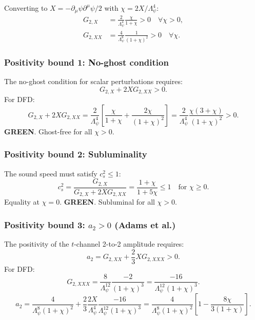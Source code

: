 \documentclass[11pt,a4paper]{article}
\newcommand{\GREEN}{\textcolor{dfdgreen}{\textbf{GREEN}}}
\begin{document}
Converting to $X = -\partial_\mu\psi\partial^\mu\psi/2$ with $\chi = 2X/\Lambda_\psi^4$:
\begin{align}
G_{2,X} &= \frac{2}{\Lambda_\psi^4}\frac{\chi}{1+\chi} > 0 \quad \forall \chi > 0, \label{eq:G2X-pos}\\
G_{2,XX} &= \frac{4}{\Lambda_\psi^8}\frac{1}{(1+\chi)^2} > 0 \quad \forall \chi. \label{eq:G2XX-pos}
\end{align}

\subsubsection{Positivity bound 1: No-ghost condition}

The no-ghost condition for scalar perturbations requires:
\begin{equation}
G_{2,X} + 2X G_{2,XX} > 0.
\end{equation}
For DFD:
\begin{equation}
G_{2,X} + 2X G_{2,XX} = \frac{2}{\Lambda_\psi^4}\left[\frac{\chi}{1+\chi} + \frac{2\chi}{(1+\chi)^2}\right] = \frac{2}{\Lambda_\psi^4}\frac{\chi(3+\chi)}{(1+\chi)^2} > 0.
\end{equation}
\GREEN. Ghost-free for all $\chi > 0$.

\subsubsection{Positivity bound 2: Subluminality}

The sound speed must satisfy $c_s^2 \leq 1$:
\begin{equation}
c_s^2 = \frac{G_{2,X}}{G_{2,X} + 2X G_{2,XX}} = \frac{1+\chi}{1+5\chi} \leq 1 \quad \text{for } \chi \geq 0.
\end{equation}
Equality at $\chi = 0$. \GREEN. Subluminal for all $\chi > 0$.

\subsubsection{Positivity bound 3: $a_2 > 0$ (Adams et al.)}

The positivity of the $t$-channel 2-to-2 amplitude requires:
\begin{equation}
a_2 = G_{2,XX} + \frac{2}{3}X G_{2,XXX} > 0.
\end{equation}
For DFD:
\begin{equation}
G_{2,XXX} = \frac{8}{\Lambda_\psi^{12}}\frac{-2}{(1+\chi)^3} = \frac{-16}{\Lambda_\psi^{12}(1+\chi)^3}.
\end{equation}
\begin{equation}
a_2 = \frac{4}{\Lambda_\psi^8(1+\chi)^2} + \frac{2}{3}\frac{2X}{\Lambda_\psi^4}\frac{-16}{\Lambda_\psi^{12}(1+\chi)^3} = \frac{4}{\Lambda_\psi^8(1+\chi)^2}\left[1 - \frac{8\chi}{3(1+\chi)}\right].
\end{equation}
\end{document}
